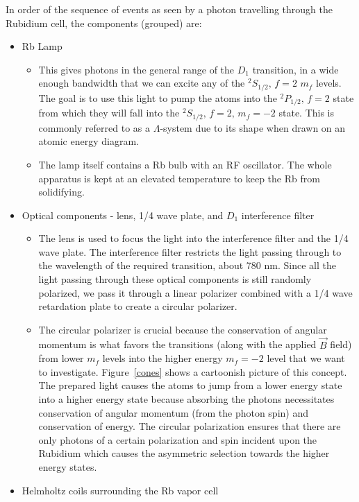 \documentclass{article}
\newcommand{\twohalfmf}[2]{$^2 #1_{1/2},\, f = 2,\, m_f = #2$}
\newcommand{\twohalf}[1]{$^2 #1_{1/2},\, f = 2$}
\begin{document}
  In order of the sequence of events as seen by a photon travelling through the Rubidium cell, the components (grouped) are:
  \begin{itemize}
    \item Rb Lamp
    \begin{itemize}
      \item This gives photons in the general range of the $D_1$ transition, in a wide enough bandwidth that we can excite any of the \twohalf{S} $m_f$ levels.  The goal is to use this light to pump the atoms into the \twohalf{P} state from which they will fall into the \twohalfmf{S}{-2} state.  This is commonly referred to as a $\Lambda$-system due to its shape when drawn on an atomic energy diagram.
      \item The lamp itself contains a Rb bulb with an RF oscillator.  The whole apparatus is kept at an elevated temperature to keep the Rb from solidifying.
    \end{itemize}
    \item Optical components - lens, 1/4 wave plate, and $D_1$ interference filter
    \begin{itemize}
      \item The lens is used to focus the light into the interference filter and the 1/4 wave plate.  The interference filter restricts the light passing through to the wavelength of the required transition, about 780 nm.  Since all the light passing through these optical components is still randomly polarized, we pass it through a linear polarizer combined with a 1/4 wave retardation plate to create a circular polarizer.
      \item The circular polarizer is crucial because the conservation of angular momentum is what favors the transitions (along with the applied $\vec{B}$ field) from lower $m_f$ levels into the higher energy $m_f = -2$ level that we want to investigate.  Figure~\ref{cones}  shows a cartoonish picture of this concept.  The prepared light causes the atoms to jump from a lower energy state into a higher energy state because absorbing the photons necessitates conservation of angular momentum (from the photon spin) and conservation of energy.  The circular polarization ensures that there are only photons of a certain polarization and spin incident upon the Rubidium which causes the asymmetric selection towards the higher energy states.
    \end{itemize}
    \item Helmholtz coils surrounding the Rb vapor cell
    \begin{itemize}

\end{itemize}
\end{itemize}
\end{document}
